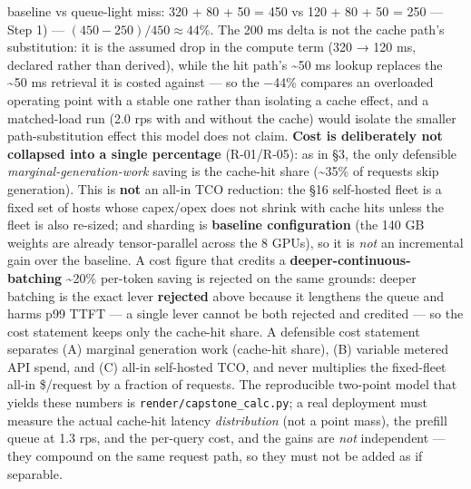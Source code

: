 baseline vs queue-light miss: 320 + 80 + 50 = 450 vs 120 + 80 + 50 = 250
--- Step 1) --- \((450-250)/450 \approx 44\%\). The 200 ms delta is not
the cache path's substitution: it is the assumed drop in the compute
term (320 → 120 ms, declared rather than derived), while the hit path's
\textasciitilde50 ms lookup replaces the \textasciitilde50 ms retrieval
it is costed against --- so the −44\% compares an overloaded operating
point with a stable one rather than isolating a cache effect, and a
matched-load run (2.0 rps with and without the cache) would isolate the
smaller path-substitution effect this model does not claim. \textbf{Cost
is deliberately not collapsed into a single percentage} (R-01/R-05): as
in §3, the only defensible \emph{marginal-generation-work} saving is the
cache-hit share (\textasciitilde35\% of requests skip generation). This
is \textbf{not} an all-in TCO reduction: the §16 self-hosted fleet is a
fixed set of hosts whose capex/opex does not shrink with cache hits
unless the fleet is also re-sized; and sharding is \textbf{baseline
configuration} (the 140 GB weights are already tensor-parallel across
the 8 GPUs), so it is \emph{not} an incremental gain over the baseline.
A cost figure that credits a \textbf{deeper-continuous-batching}
\textasciitilde20\% per-token saving is rejected on the same grounds:
deeper batching is the exact lever \textbf{rejected} above because it
lengthens the queue and harms p99 TTFT --- a single lever cannot be both
rejected and credited --- so the cost statement keeps only the cache-hit
share. A defensible cost statement separates (A) marginal generation
work (cache-hit share), (B) variable metered API spend, and (C) all-in
self-hosted TCO, and never multiplies the fixed-fleet all-in \$/request
by a fraction of requests. The reproducible two-point model that yields
these numbers is \texttt{render/capstone\_calc.py}; a real deployment
must measure the actual cache-hit latency \emph{distribution} (not a
point mass), the prefill queue at 1.3 rps, and the per-query cost, and
the gains are \emph{not} independent --- they compound on the same
request path, so they must not be added as if separable.


